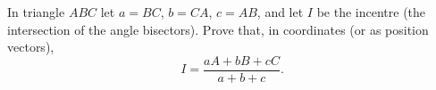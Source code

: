 In triangle $ABC$ let $a=BC$, $b=CA$, $c=AB$, and let $I$ be the incentre (the intersection of the angle bisectors). Prove that, in coordinates (or as position vectors),
\[
I=\dfrac{aA+bB+cC}{a+b+c}.
\]
